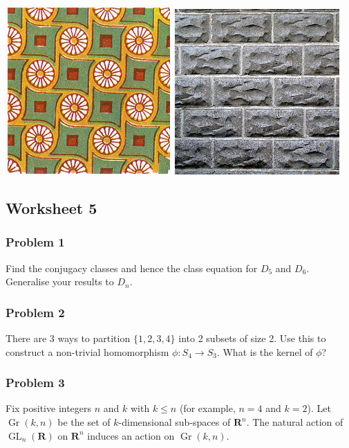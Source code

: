\documentclass[11pt]{article}
\begin{document}
\includegraphics[width=.4\textwidth]{assets/Lectures/2022-08-18_09-19-05_screenshot.png}
\hfill
\includegraphics[width=.4\textwidth]{assets/Lectures/2022-08-18_09-21-25_screenshot.png}

\subsection{Worksheet 5}
\label{sec:org34c5f0a}
\subsubsection{Problem 1}
\label{sec:orgbc9dec5}
Find the conjugacy classes and hence the class equation for \(D_{5}\) and \(D_{6}\).
Generalise your results to \(D_{n}\).

\subsubsection{Problem 2}
\label{sec:orgf39b3e4}
There are 3 ways to partition \(\{1,2,3,4\}\) into 2 subsets of size 2.
Use this to construct a non-trivial homomorphism \(\phi \colon S_4 \to S_3\).
What is the kernel of \(\phi\)?

\subsubsection{Problem 3}
\label{sec:org4a18956}
Fix positive integers \(n\) and \(k\) with \(k \leq n\) (for example, \(n = 4\) and \(k = 2\)).
Let \(\operatorname{Gr}(k,n)\) be the set of \(k\)-dimensional sub-spaces of \(\mathbf{R}^n\).
The natural action of \(\operatorname{GL}_n(\mathbf{R})\) on \(\mathbf{R}^{n}\) induces an action on \(\operatorname{Gr}(k,n)\).
\end{document}
